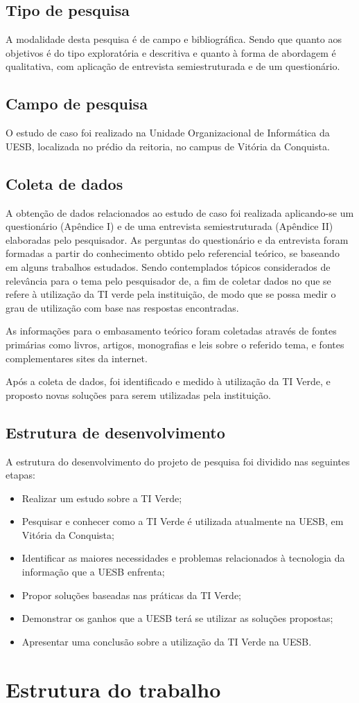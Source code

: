 \subsection{Tipo de pesquisa}
A modalidade desta pesquisa é de campo e bibliográfica. Sendo que quanto aos objetivos é do tipo exploratória e descritiva e quanto à forma de abordagem é qualitativa, com aplicação de entrevista semiestruturada e de um questionário.

\subsection{Campo de pesquisa}
O estudo de caso foi realizado na Unidade Organizacional de Informática da UESB, localizada no prédio da reitoria, no campus de Vitória da Conquista.

\subsection{Coleta de dados}
A obtenção de dados relacionados ao estudo de caso foi realizada aplicando-se um questionário (Apêndice I) e de uma entrevista semiestruturada (Apêndice II) elaboradas pelo pesquisador. As perguntas do questionário e da entrevista foram formadas a partir do conhecimento obtido pelo referencial teórico, se baseando em alguns trabalhos estudados. Sendo contemplados tópicos considerados de relevância para o tema pelo pesquisador de, a fim de coletar dados no que se refere à utilização da TI verde pela instituição, de modo que se possa medir o grau de utilização com base nas respostas encontradas. 

As informações para o embasamento teórico foram coletadas através de fontes primárias como livros, artigos, monografias e leis sobre o referido tema, e fontes complementares sites da internet. 

Após a coleta de dados, foi identificado e medido à utilização da TI Verde, e proposto novas soluções para serem utilizadas pela instituição.

\subsection{Estrutura de desenvolvimento}
A estrutura do desenvolvimento do projeto de pesquisa foi dividido nas seguintes etapas:

\begin{itemize}
  \item Realizar um estudo sobre a TI Verde;
  \item Pesquisar e conhecer como a TI Verde é utilizada atualmente na UESB, em Vitória da Conquista;
  \item Identificar as maiores necessidades e problemas relacionados à tecnologia da informação que a UESB enfrenta;
  \item Propor soluções baseadas nas práticas da TI Verde;
  \item Demonstrar os ganhos que a UESB terá se utilizar as soluções propostas;
  \item Apresentar uma conclusão sobre a utilização da TI Verde na UESB.
\end{itemize}


\section{Estrutura do trabalho}